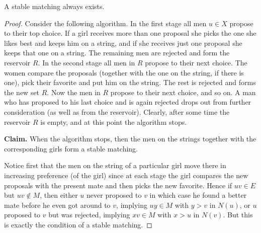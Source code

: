 \begin{lemma}
  \label{ch38lemma2}
  A stable matching always exists.
\end{lemma}
\begin{proof}
Consider the following algorithm. In the first stage all men $u \in X$ propose to their top choice.
If a girl receives more than one proposal she picks the one she likes best and keeps him on a
string, and if she receives just one proposal she keeps that one on a string. The remaining men
are rejected and form the reservoir $R$. In the second stage all men in $R$ propose to their next
choice. The women compare the proposals (together with the one on the string, if there is one),
pick their favorite and put him on the string. The rest is rejected and forms the new set $R$.
Now the men in $R$ propose to their next choice, and so on. A man who has proposed to his last
choice and is again rejected drops out from further consideration (as well as from the reservoir).
Clearly, after some time the reservoir $R$ is empty, and at this point the algorithm stops.

\textbf{Claim.} When the algorithm stops, then the men on the strings together with the
corresponding girls form a stable matching.

Notice first that the men on the string of a particular girl move there in increasing
preference (of the girl) since at each stage the girl compares the new proposals with the
present mate and then picks the new favorite. Hence if $uv \in E$ but $uv \notin M$, then
either $u$ never proposed to $v$ in which case he found a better mate before he even got
around to $v$, implying $uy \in M$ with $y > v$ in $N(u)$, or $u$ proposed to $v$ but was
rejected, implying $xv \in M$ with $x > u$ in $N(v)$. But this is exactly the condition of a
stable matching.
\end{proof}


